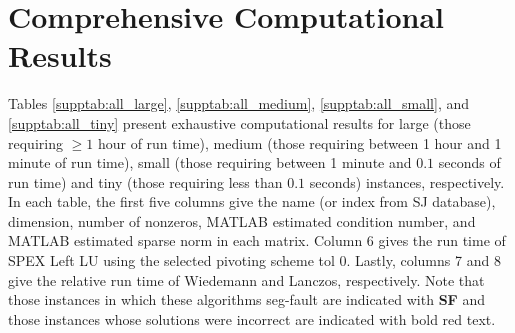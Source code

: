 \documentclass[10pt]{article}
\newcommand{\red}{
	\color{red}	
	}
\begin{document}
\appendix

\section{Comprehensive Computational Results} \label{s:ResultsALL}

Tables \ref{supptab:all_large}, \ref{supptab:all_medium}, \ref{supptab:all_small}, and \ref{supptab:all_tiny} present exhaustive computational results for large (those requiring $\geq1$ hour of run time), medium (those requiring between 1 hour and 1 minute of run time), small (those requiring between 1 minute and $0.1$ seconds of run time) and tiny (those requiring less than $0.1$ seconds) instances, respectively. In each table, the first five columns give the name (or index from SJ database), dimension, number of nonzeros, MATLAB estimated condition number, and MATLAB estimated sparse norm in each matrix. Column 6 gives the run time of SPEX Left LU using the selected pivoting scheme tol 0. Lastly, columns 7 and 8 give the relative run time of Wiedemann and Lanczos, respectively. Note that those instances in which these algorithms seg-fault are indicated with {\bf \red SF} and those instances whose solutions were incorrect are indicated with bold red text.
\end{document}
